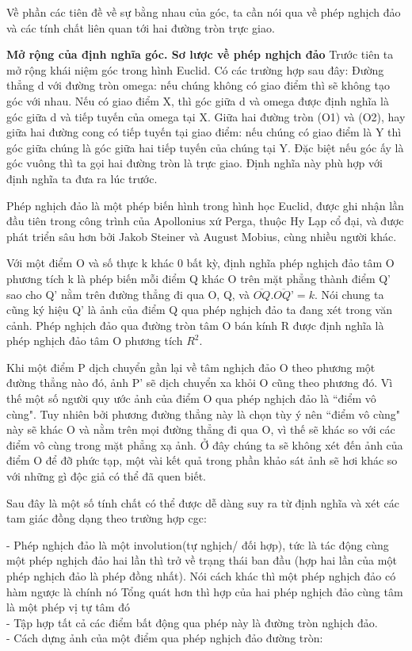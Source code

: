 \begin{multicols}{2}
	Về phần các tiên đề về sự bằng nhau của góc, ta cần nói qua về phép nghịch đảo và các tính chất liên quan tới hai đường tròn trực giao.
	
	\textbf{\color{lichsutoanhoc}Mở rộng của định nghĩa góc. Sơ lược về phép nghịch đảo}
	Trước tiên ta mở rộng khái niệm góc trong hình Euclid. Có các trường hợp sau đây:
	Đường thẳng d với đường tròn omega: nếu chúng không có giao điểm thì sẽ không tạo góc với nhau. Nếu có giao điểm X, thì góc giữa d và omega được định nghĩa là góc giữa d và tiếp tuyến của omega tại X.
	Giữa hai đường tròn (O1) và (O2), hay giữa hai đường cong có tiếp tuyến tại giao điểm: nếu chúng có giao điểm là Y thì góc giữa chúng là góc giữa hai tiếp tuyến của chúng tại Y. Đặc biệt nếu góc ấy là góc vuông thì ta gọi hai đường tròn là trực giao. Định nghĩa này phù hợp với định nghĩa ta đưa ra lúc trước. 
	
	
	Phép nghịch đảo là một phép biến hình trong hình học Euclid, được ghi nhận lần đầu tiên trong công trình của Apollonius xứ Perga, thuộc Hy Lạp cổ đại, và được phát triển sâu hơn bởi Jakob Steiner và August Mobius, cùng nhiều người khác.
	
	Với một điểm O và số thực k khác 0 bất kỳ, định nghĩa phép nghịch đảo tâm O phương tích k là phép biến mỗi điểm Q khác O trên mặt phẳng thành điểm Q’ sao cho Q’ nằm trên đường thẳng đi qua O, Q, và $ \overline{OQ}.\overline{OQ’} = k$. Nói chung ta cũng ký hiệu Q’ là ảnh của điểm Q qua phép nghịch đảo ta đang xét trong văn cảnh.
	Phép nghịch đảo qua đường tròn tâm O bán kính R được định nghĩa là phép nghịch đảo tâm O phương tích $R^2$.
	
	Khi một điểm P dịch chuyển gần lại về tâm nghịch đảo O theo phương một đường thẳng nào đó, ảnh P’ sẽ dịch chuyển xa khỏi O cũng theo phương đó. Vì thế một số người quy ước ảnh của điểm O qua phép nghịch đảo là ``điểm vô cùng". Tuy nhiên bởi phương đường thẳng này là chọn tùy ý nên ``điểm vô cùng" này sẽ khác O và nằm trên mọi đường thẳng đi qua O, vì thế sẽ khác so với các điểm vô cùng trong mặt phẳng xạ ảnh. Ở đây chúng ta sẽ không xét đến ảnh của điểm O để đỡ phức tạp, một vài kết quả trong phần khảo sát ảnh sẽ hơi khác so với những gì độc giả có thể đã quen biết.
	
	Sau đây là một số tính chất có thể được dễ dàng suy ra từ định nghĩa và xét các tam giác đồng dạng theo trường hợp cgc:
	
	- Phép nghịch đảo là một involution(tự nghịch/ đối hợp), tức là tác động cùng một phép nghịch đảo hai lần thì trở về trạng thái ban đầu (hợp hai lần của một phép nghịch đảo là phép đồng nhất). Nói cách khác thì một phép nghịch đảo có hàm ngược là chính nó
	Tổng quát hơn thì hợp của hai phép nghịch đảo cùng tâm là một phép vị tự tâm đó \\
	- Tập hợp tất cả các điểm bất động qua phép này là đường tròn nghịch đảo. \\
	- Cách dựng ảnh của một điểm qua phép nghịch đảo đường tròn:
	

\end{multicols}
